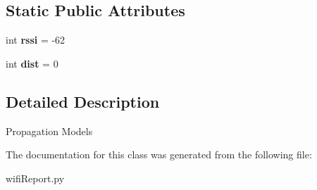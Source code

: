 \subsection*{Static Public Attributes}
\begin{DoxyCompactItemize}
\item 
\hypertarget{classmininet_1_1wifiReport_1_1report_ab9285db73d7f4761b2c7365b3a9068f0}{int {\bfseries rssi} = -\/62}\label{classmininet_1_1wifiReport_1_1report_ab9285db73d7f4761b2c7365b3a9068f0}

\item 
\hypertarget{classmininet_1_1wifiReport_1_1report_a67ef3ed12777e72f85552b8f485419ae}{int {\bfseries dist} = 0}\label{classmininet_1_1wifiReport_1_1report_a67ef3ed12777e72f85552b8f485419ae}

\end{DoxyCompactItemize}


\subsection{Detailed Description}
\begin{DoxyVerb}Propagation Models \end{DoxyVerb}
 

The documentation for this class was generated from the following file\-:\begin{DoxyCompactItemize}
\item 
wifi\-Report.\-py\end{DoxyCompactItemize}
